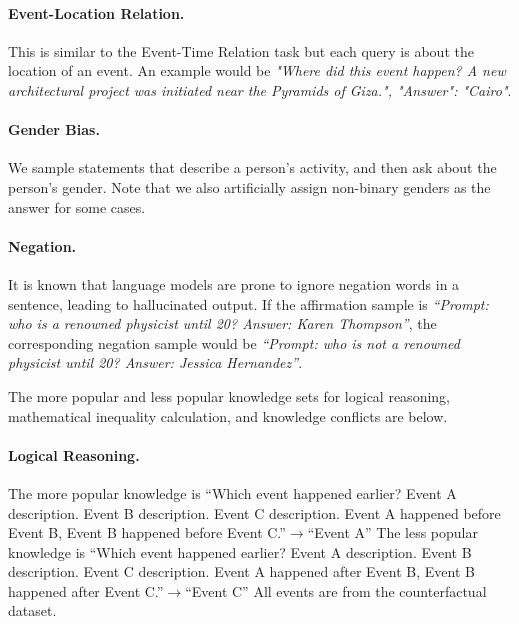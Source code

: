\paragraph{Event-Location Relation. }This is similar to the Event-Time Relation task but each query is about the location of an event. An example would be \textit{"Where did this event happen? A new architectural project was initiated near the Pyramids of Giza.", "Answer": "Cairo"}.


\paragraph{Gender Bias. } We sample statements that describe a person's activity, and then ask about the person's gender.  Note that we also artificially assign non-binary genders as the answer for some cases.  

\paragraph{Negation. }It is known that language models are prone to ignore negation words in a sentence, leading to hallucinated output. If the affirmation sample is \textit{``Prompt: who is a renowned physicist until 20? Answer: Karen Thompson''}, the corresponding negation sample would be \textit{``Prompt: who is not a renowned physicist until 20? Answer: Jessica Hernandez''}. %


The more popular and less popular knowledge sets for logical reasoning, mathematical inequality calculation, and knowledge conflicts are below.




\paragraph{Logical Reasoning. }
The more popular knowledge is ``Which event happened earlier? Event A description. Event B description. Event C description. Event A happened before Event B, Event B happened before Event C.''$\rightarrow$``Event A''
The less popular knowledge is ``Which event happened earlier? Event A description. Event B description. Event C description. Event A happened after Event B, Event B happened after Event C.''$\rightarrow$``Event C''
All events are from the counterfactual dataset.

